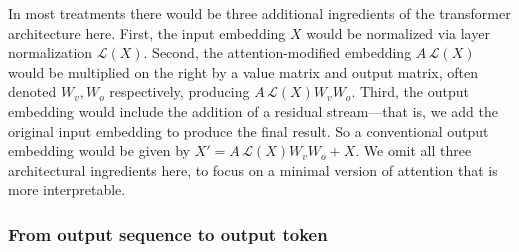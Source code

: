 \documentclass{article}
\newcommand{\cL}{\mathcal{L}}
\begin{document}
In most treatments there would be three additional ingredients of the
transformer architecture here. First, the input embedding $X$ would be
normalized via layer normalization $\cL(X)$. Second, the
attention-modified embedding $A\, \cL(X)$ would be multiplied on the right
by a value matrix and output matrix, often denoted $W_v, W_o$
respectively, producing $A\, \cL(X) W_v W_o$. Third, the output embedding
would include the addition of a residual stream---that is, we add the
original input embedding to produce the final result. So a
conventional output embedding would be given by
$X' = A \,\cL(X) W_v W_o + X$. We omit all three architectural ingredients
here, to focus on a minimal version of attention that is more
interpretable.


\subsubsection*{From output sequence to output token}
\end{document}
